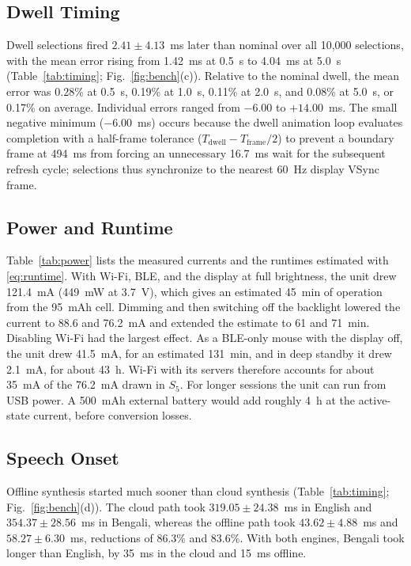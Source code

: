 \documentclass[journal]{IEEEtran}
\begin{document}
\subsection{Dwell Timing}
Dwell selections fired $2.41\pm4.13$~ms later than nominal over all 10,000 selections, with the mean error rising from 1.42~ms at 0.5~s to 4.04~ms at 5.0~s (Table~\ref{tab:timing}; Fig.~\ref{fig:bench}(c)). Relative to the nominal dwell, the mean error was 0.28\% at 0.5~s, 0.19\% at 1.0~s, 0.11\% at 2.0~s, and 0.08\% at 5.0~s, or 0.17\% on average. Individual errors ranged from $-6.00$ to $+14.00$~ms. The small negative minimum ($-6.00$~ms) occurs because the dwell animation loop evaluates completion with a half-frame tolerance ($T_{\mathrm{dwell}} - T_{\mathrm{frame}}/2$) to prevent a boundary frame at 494~ms from forcing an unnecessary 16.7~ms wait for the subsequent refresh cycle; selections thus synchronize to the nearest 60~Hz display VSync frame.

\subsection{Power and Runtime}
Table~\ref{tab:power} lists the measured currents and the runtimes estimated with \eqref{eq:runtime}. With Wi-Fi, BLE, and the display at full brightness, the unit drew 121.4~mA (449~mW at 3.7~V), which gives an estimated 45~min of operation from the 95~mAh cell. Dimming and then switching off the backlight lowered the current to 88.6 and 76.2~mA and extended the estimate to 61 and 71~min. Disabling Wi-Fi had the largest effect. As a BLE-only mouse with the display off, the unit drew 41.5~mA, for an estimated 131~min, and in deep standby it drew 2.1~mA, for about 43~h. Wi-Fi with its servers therefore accounts for about 35~mA of the 76.2~mA drawn in $S_5$. For longer sessions the unit can run from USB power. A 500~mAh external battery would add roughly 4~h at the active-state current, before conversion losses.

\subsection{Speech Onset}
Offline synthesis started much sooner than cloud synthesis (Table~\ref{tab:timing}; Fig.~\ref{fig:bench}(d)). The cloud path took $319.05\pm24.38$~ms in English and $354.37\pm28.56$~ms in Bengali, whereas the offline path took $43.62\pm4.88$~ms and $58.27\pm6.30$~ms, reductions of 86.3\% and 83.6\%. With both engines, Bengali took longer than English, by 35~ms in the cloud and 15~ms offline.
\end{document}
